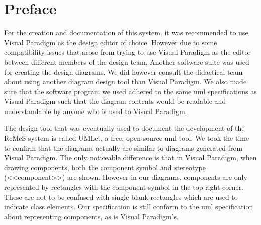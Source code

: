 \section{Preface}
For the creation and documentation of this system, it was recommended to use Visual Paradigm 
as the design editor of choice. However due to some compatibility issues that arose
from trying to use Visual Paradigm as the editor between different members of the design team, 
Another software suite was used for creating the design diagrams.
We did however consult the didactical team about using another diagram design tool than 
Visual Paradigm. 
We also made sure that the software program we used adhered to the same uml specifications
as Visual Paradigm such that the diagram contents would be readable and understandable by anyone
who is used to Visual Paradigm. 

The design tool that was eventually used to document the development of the ReMeS system is called
UMLet, a free, open-source uml tool.
We took the time to confirm that the diagrams actually are similar to diagrams generated from Visual Paradigm. The only noticeable difference is that in Visual Paradigm, when drawing components, both the component symbol and stereotype (<<component>>) are shown. However in our diagrams, components are only represented by rectangles with the component-symbol in the top right corner. 
These are not to be confused with single blank rectangles which are used to indicate class elements.
Our specification is still conform to the uml specification about representing components, as is Visual Paradigm's.

